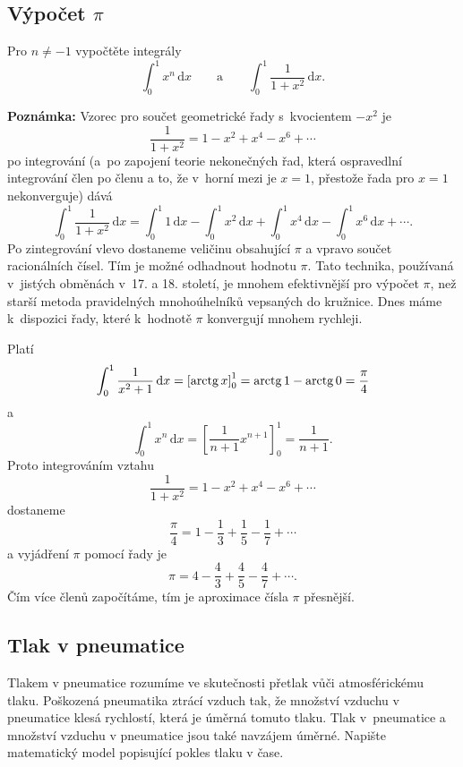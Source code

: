 \stranka

\subsection{Výpočet $\pi$}  Pro $n\neq -1$ vypočtěte integrály
$$\int_0^1 x^n\,\mathrm dx \qquad \text{a} \qquad \int_0^1
\frac{1}{1+x^2}\,\mathrm dx.$$

\textbf{Poznámka:} Vzorec pro součet geometrické
řady s kvocientem $-x^2$ je $$\frac{1}{1+x^2}=1-x^2+x^4-x^6+\cdots$$ po integrování (a po
zapojení teorie nekonečných řad, která ospravedlní integrování člen po
členu a to, že v horní mezi je $x=1$, přestože řada pro $x=1$ nekonverguje) dává
$$
\int_0^1 \frac{1}{1+x^2}\,\mathrm dx
=
\int_0^1 1\,\mathrm dx
-
\int_0^1 x^2\,\mathrm dx
+
\int_0^1 x^4\,\mathrm dx
-
\int_0^1 x^6\,\mathrm dx
+\cdots .
$$
Po zintegrování vlevo dostaneme veličinu obsahující $\pi$ a vpravo
součet racionálních čísel. Tím je možné odhadnout hodnotu $\pi$. Tato
technika, používaná v~jistých obměnách v~17. a 18. století, je mnohem
efektivnější pro výpočet $\pi$, než starší metoda pravidelných
mnohoúhelníků vepsaných do kružnice. Dnes máme k dispozici řady,
které k hodnotě $\pi$ konvergují mnohem rychleji.

\reseni

Platí $$\int_0^1 \frac {1}{x^2+1}\,\mathrm dx=\left [\mathop{\mathrm{arctg}} x\right]_0^1=\mathop{\mathrm{arctg}} 1 - \mathop{\mathrm{arctg}} 0 = \frac \pi 4$$
a
$$\int_0^1 x^n \,\mathrm dx=\left[\frac 1{n+1} x^{n+1}\right]_0^1=\frac 1{n+1}.$$
Proto integrováním vztahu
$$\frac{1}{1+x^2}=1-x^2+x^4-x^6+\cdots$$
dostaneme
$$\frac{\pi}{4}=1-\frac 13 +\frac 15 - \frac 17+\cdots$$
a vyjádření $\pi$ pomocí řady je
$$\pi=4-\frac 43 +\frac 45 - \frac 47+\cdots .$$
Čím více členů započítáme, tím je aproximace čísla $\pi$ přesnější.
\konec




\subsection{Tlak v pneumatice}

Tlakem v pneumatice rozumíme ve skutečnosti přetlak vůči atmosférickému tlaku. Poškozená pneumatika ztrácí vzduch tak, že množství vzduchu v pneumatice klesá rychlostí, která je úměrná tomuto tlaku. Tlak v~pneumatice a množství vzduchu v pneumatice jsou také navzájem úměrné. Napište matematický model popisující pokles tlaku v čase.


\reseni

